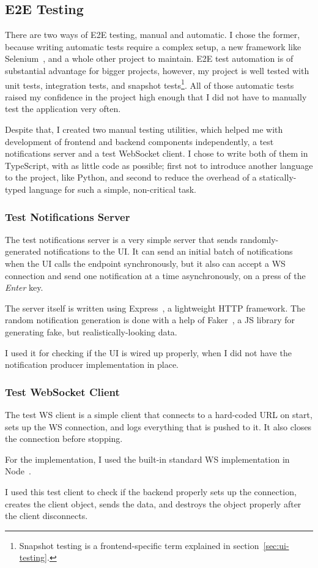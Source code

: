 \subsection{E2E Testing}\label{sec:e2e-testing}

There are two ways of E2E testing,
manual and automatic.
I chose the former,
because writing automatic tests
require a complex setup,
a new framework like Selenium~\cite{steward_selenium_2022},
and a whole other project to maintain.
E2E test automation is of substantial advantage
for bigger projects, however,
my project is well tested with
unit tests,
integration tests, and
snapshot tests\footnote{
  Snapshot testing is a frontend-specific term
  explained in section~\ref{sec:ui-testing}.
}.
All of those automatic tests
raised my confidence in the project high enough
that I did not have to manually test
the application very often.

Despite that,
I created two manual testing utilities,
which helped me with development
of frontend and backend components independently,
a test notifications server
and a test WebSocket client.
I chose to write both of them in TypeScript,
with as little code as possible;
first not to introduce another language
to the project, like Python,
and second to reduce the overhead
of a statically-typed language
for such a simple, non-critical task.

\subsubsection{Test Notifications Server}\label{sec:test-notifications-server}

The test notifications server
is a very simple server that sends
randomly-generated notifications to the UI.
It can send an initial batch of notifications
when the UI calls the endpoint synchronously,
but it also can accept a WS connection
and send one notification at a time asynchronously,
on a press of the \textit{Enter} key.

The server itself is written
using Express~\cite{holowaychuck_express_2022},
a lightweight HTTP framework.
The random notification generation
is done with a help of Faker~\cite{marak_faker_2022},
a JS library for generating fake,
but realistically-looking data.

I used it for checking if the UI
is wired up properly,
when I did not have
the notification producer
implementation in place.

\subsubsection{Test WebSocket Client}\label{sec:test-ws-client}

The test WS client
is a simple client that connects
to a hard-coded URL on start,
sets up the WS connection,
and logs everything that is pushed to it.
It also closes the connection before stopping.

For the implementation,
I used the built-in standard WS implementation
in Node~\cite{trott_node_2022}.

I used this test client
to check if the backend properly
sets up the connection,
creates the client object,
sends the data,
and destroys the object properly
after the client disconnects.
